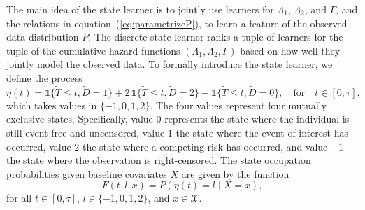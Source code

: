 \documentclass[a4paper,danish]{article}
\theoremstyle{plain} %
\numberwithin{theorem}{section}
\theoremstyle{definition} %
\theoremstyle{remark}
\newcommand{\1}{\mathds{1}}
\begin{document}
The main idea of the state learner is to jointly use learners for \(
\Lambda_1 \), \( \Lambda_2 \), and \( \Gamma \), and the relations in
equation~(\ref{eq:parametrizeP}), to learn a feature of the observed
data distribution \( P \). The discrete state learner ranks a tuple of
learners for the tuple of the cumulative hazard functions \(
(\Lambda_1, \Lambda_2, \Gamma) \) based on how well they jointly model
the observed data. To formally introduce the state learner, we define
the process 
\begin{equation*}
  \eta(t) = \1\{\tilde{T} \leq t, \tilde D=1\} + 2\,\1\{\tilde{T} \leq t, \tilde
  D=2\} - \1\{\tilde{T} \leq t, \tilde D=0\},
  \quad \text{for} \quad t \in [0, \tau],
\end{equation*}
which takes values in \( \{-1,0,1,2\}\). The four values
represent four mutually exclusive states. Specifically, value
\( 0 \) represents the state where the individual is still
event-free and uncensored, value \( 1\) the state where the
event of interest has occurred, value \( 2\) the state where a
competing risk has occurred, and value \( -1\) the state where
the observation is right-censored. The state occupation
probabilities given baseline covariates \( X \) are given by
the function
\begin{equation}
  \label{eq:F-def}
  F(t, l, x) = P(\eta(t) = l \mid X=x),
\end{equation}
for all \( t \in [0,\tau] \), \( l \in \{-1,0,1,2\} \), and
\( x \in \mathcal{X} \).
\end{document}
